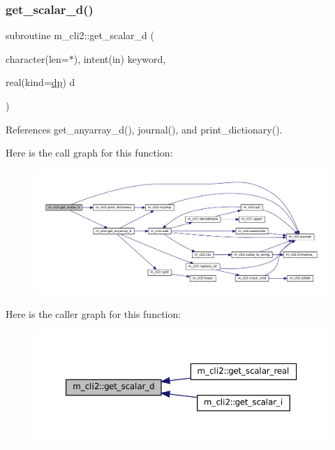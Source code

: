 \subsubsection{\texorpdfstring{get\+\_\+scalar\+\_\+d()}{get\_scalar\_d()}}
{\footnotesize\ttfamily subroutine m\+\_\+cli2\+::get\+\_\+scalar\+\_\+d (\begin{DoxyParamCaption}\item[{character(len=$\ast$), intent(in)}]{keyword,  }\item[{real(kind=\mbox{\hyperlink{namespacem__cli2_acf83f1963cf6a56ad0221cfcf5402440}{dp}})}]{d }\end{DoxyParamCaption})\hspace{0.3cm}{\ttfamily [private]}}



References get\+\_\+anyarray\+\_\+d(), journal(), and print\+\_\+dictionary().

Here is the call graph for this function\+:
\nopagebreak
\begin{figure}[H]
\begin{center}
\leavevmode
\includegraphics[width=350pt]{namespacem__cli2_a338757660adde093db76b7d5559a1906_cgraph}
\end{center}
\end{figure}
Here is the caller graph for this function\+:
\nopagebreak
\begin{figure}[H]
\begin{center}
\leavevmode
\includegraphics[width=350pt]{namespacem__cli2_a338757660adde093db76b7d5559a1906_icgraph}
\end{center}
\end{figure}
\mbox{\label{namespacem__cli2_a9dcc99d34db1771959a1461274ae073e}} 
